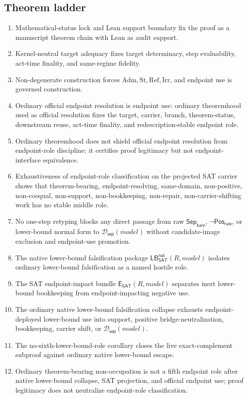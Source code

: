 \documentclass[11pt]{article}
\theoremstyle{definition}
\theoremstyle{remark}
\newcommand{\PosRaw}{\mathsf{Pos}_{\mathsf{raw}}}
\newcommand{\SepBare}{\mathsf{Sep}_{\mathsf{bare}}}
\newcommand{\Adm}{\mathrm{Adm}}
\newcommand{\St}{\mathrm{St}}
\newcommand{\RefK}{\mathrm{Ref}}
\newcommand{\Irr}{\mathrm{Irr}}
\newcommand{\SepDisc}{\mathcal{D}_{\mathsf{sep}}}
\newcommand{\LBNatSAT}{\mathsf{LB}^{\mathsf{nat}}_{\mathsf{SAT}}}
\newcommand{\EndpointImpactSAT}{\mathsf{E}_{\mathsf{SAT}}}
\begin{document}
\subsection*{Theorem ladder}
\begin{enumerate}
\item Mathematical-status lock and Lean support boundary fix the proof as a manuscript theorem chain with Lean as audit support.
\item Kernel-neutral target adequacy fixes target determinacy, step evaluability, act-time finality, and same-regime fidelity.
\item Non-degenerate construction forces \(\Adm,\St,\RefK,\Irr\), and endpoint use is governed construction.
\item Ordinary official endpoint resolution is endpoint use: ordinary theoremhood used as official resolution fixes the target, carrier, branch, theorem-status, downstream reuse, act-time finality, and redescription-stable endpoint role.
\item Ordinary theoremhood does not shield official endpoint resolution from endpoint-role discipline; it certifies proof legitimacy but not endpoint-interface equivalence.
\item Exhaustiveness of endpoint-role classification on the projected SAT carrier shows that theorem-bearing, endpoint-resolving, same-domain, non-positive, non-coequal, non-support, non-bookkeeping, non-repair, non-carrier-shifting work has no stable middle role.
\item No one-step retyping blocks any direct passage from raw \(\SepBare\), \(\neg\PosRaw\), or lower-bound normal form to \(\SepDisc(model)\) without candidate-image exclusion and endpoint-use promotion.
\item The native lower-bound falsification package \(\LBNatSAT(R,model)\) isolates ordinary lower-bound falsification as a named hostile role.
\item The SAT endpoint-impact bundle \(\EndpointImpactSAT(R,model)\) separates inert lower-bound bookkeeping from endpoint-impacting negative use.
\item The ordinary native lower-bound falsification collapse exhausts endpoint-deployed lower-bound use into support, positive bridge-neutralization, bookkeeping, carrier shift, or \(\SepDisc(model)\).
\item The no-sixth-lower-bound-role corollary closes the live exact-complement subproof against ordinary native lower-bound escape.
\item Ordinary theorem-bearing non-occupation is not a fifth endpoint role after native lower-bound collapse, SAT projection, and official endpoint use; proof legitimacy does not neutralize endpoint-role classification.

\end{enumerate}
\end{document}
